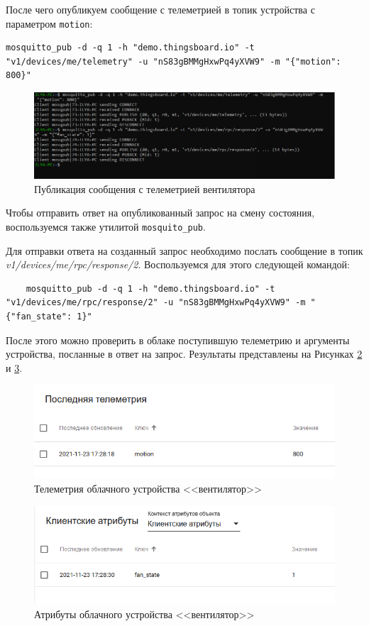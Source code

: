 \documentclass[utf8x]{G7-32} %
\begin{document}
После чего опубликуем сообщение с телеметрией в топик устройства с параметром
\texttt{motion}:

\begin{lstlisting}
mosquitto_pub -d -q 1 -h "demo.thingsboard.io" -t "v1/devices/me/telemetry" -u "nS83gBMMgHxwPq4yXVW9" -m "{"motion": 800}"
\end{lstlisting}

\begin{figure}[h!]
	\centering
	\includegraphics[width=0.6\linewidth]{images/t1-sender}
	\caption{Публикация сообщения с телеметрией вентилятора}
	\label{fig:t1-sender}
\end{figure}

Чтобы отправить ответ на опубликованный запрос на смену состояния, воспользуемся
также утилитой \texttt{mosquito\_pub}.

Для отправки ответа на созданный запрос необходимо послать сообщение в топик
\textit{v1/devices/me/rpc/response/2}. Воспользуемся для этого следующей командой:

\begin{lstlisting}
	mosquitto_pub -d -q 1 -h "demo.thingsboard.io" -t "v1/devices/me/rpc/response/2" -u "nS83gBMMgHxwPq4yXVW9" -m "{"fan_state": 1}"
\end{lstlisting}

После этого можно проверить в облаке поступившую телеметрию и аргументы устройства,
посланные в ответ на запрос. Результаты представлены на Рисунках \ref{fig:tel} и \ref{fig:attr}.

\begin{figure}[h!]
	\centering
	\includegraphics[width=0.6\linewidth]{images/tel}
	\caption{Телеметрия облачного устройства <<вентилятор>>}
	\label{fig:tel}
\end{figure}


\begin{figure}[h!]
	\centering
	\includegraphics[width=0.6\linewidth]{images/attr}
	\caption{Атрибуты облачного устройства <<вентилятор>>}
	\label{fig:attr}
\end{figure}
\end{document}
